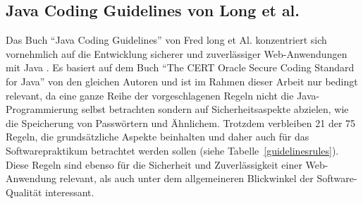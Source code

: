 \documentclass[da,ngerman]{stthesis}
\begin{document}
			\subsection{Java Coding Guidelines von Long et al.}
				Das Buch "`Java Coding Guidelines"' von Fred long et Al. konzentriert sich vornehmlich auf die Entwicklung sicherer und zuverlässiger Web-Anwendungen mit Java \cite{JavaCodingGuidelines}. Es basiert auf dem Buch "`The CERT Oracle Secure Coding Standard for Java"' von den gleichen Autoren \cite{SecureCodingStandard} und ist im Rahmen dieser Arbeit nur bedingt relevant, da eine ganze Reihe der vorgeschlagenen Regeln nicht die Java-Programmierung selbst betrachten sondern auf Sicherheitsaspekte abzielen, wie die Speicherung von Passwörtern und Ähnlichem. Trotzdem verbleiben 21 der 75 Regeln, die grundsätzliche Aspekte beinhalten und daher auch für das Softwarepraktikum betrachtet werden sollen (siehe Tabelle~\ref{guidelinesrules}). Diese Regeln sind ebenso für die Sicherheit und Zuverlässigkeit einer Web-Anwendung relevant, als auch unter dem allgemeineren Blickwinkel der Software-Qualität interessant. 
\end{document}

